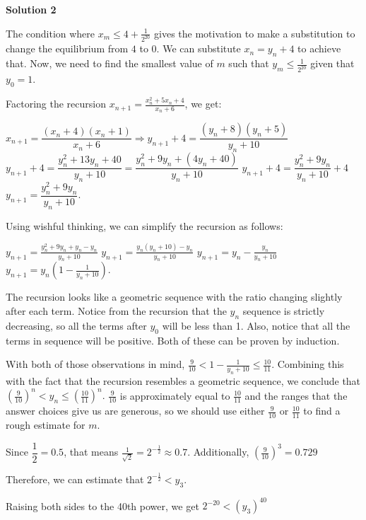 \begin{enumerate}
 



\textbf{Solution 2}

The condition where $x_m\leq 4+\frac{1}{2^{20}}$ gives the motivation to make a substitution to change the equilibrium from $4$ to $0$. We can substitute $x_n = y_n + 4$ to achieve that. Now, we need to find the smallest value of $m$ such that $y_m\leq \frac{1}{2^{20}}$ given that $y_0 = 1$. 

 


 Factoring the recursion $x_{n+1} = \frac{x_n^2 + 5x_n+4}{x_n + 6}$, we get: 

 $x_{n+1}=\dfrac{(x_n + 4)(x_n + 1)}{x_n + 6} \Rightarrow y_{n+1}+4=\dfrac{(y_n+8)(y_n+5)}{y_n+10}$
$y_{n+1}+4=\dfrac{y_n^2+13y_n+40}{y_n+10} = \dfrac{y_n^2+9y_n +(4y_n+40)}{y_n+10}$
$y_{n+1}+4=\dfrac{y_n^2+9y_n}{y_n+10} + 4$
$y_{n+1}=\dfrac{y_n^2+9y_n}{y_n+10}$.

 


 Using wishful thinking, we can simplify the recursion as follows:

 $y_{n+1} = \frac{y_n^2 + 9y_n + y_n - y_n}{y_n + 10}$
$y_{n+1} = \frac{y_n(y_n + 10) - y_n}{y_n + 10}$
$y_{n+1} = y_n - \frac{y_n}{y_n + 10}$
$y_{n+1} = y_n\left(1 - \frac{1}{y_n + 10}\right)$.

 
The recursion looks like a geometric sequence with the ratio changing slightly after each term. Notice from the recursion that the $y_n$ sequence is strictly decreasing, so all the terms after $y_0$ will be less than 1. Also, notice that all the terms in sequence will be positive. Both of these can be proven by induction.

 
With both of those observations in mind, $\frac{9}{10} < 1 - \frac{1}{y_n + 10} \leq \frac{10}{11}$. Combining this with the fact that the recursion resembles a geometric sequence, we conclude that $\left(\frac{9}{10}\right)^n < y_n \leq \left(\frac{10}{11}\right)^n.$
$\frac{9}{10}$ is approximately equal to $\frac{10}{11}$ and the ranges that the answer choices give us are generous, so we should use either $\frac{9}{10}$ or $\frac{10}{11}$ to find a rough estimate for $m$.

 
Since $\dfrac{1}{2}=0.5$, that means $\frac{1}{\sqrt{2}}=2^{-\frac{1}{2}} \approx 0.7$. Additionally, $\left(\frac{9}{10}\right)^3=0.729$

 
Therefore, we can estimate that $2^{-\frac{1}{2}} < y_3$.

 Raising both sides to the 40th power, we get $2^{-20} < (y_3)^{40}$


\end{enumerate}
